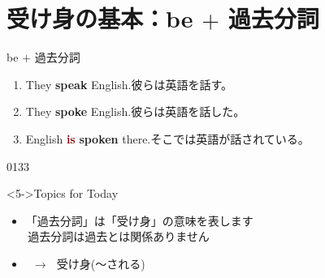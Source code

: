 \documentclass[aspectratio=169,xcolor={dvipsnames,table}]{beamer}
\newcommand{\myaudio}[1]{\href{#1}{\faVolumeUp}}
\begin{document}
\section{受け身の基本：be $+$ 過去分詞}
\begin{frame}[plain]{be $+$ 過去分詞}
 \large
\begin{enumerate}
 \item<1-> They \textbf{speak} English.\hfill{}{\small 彼らは英語を話す。}
 \item<2-> They \textbf{spoke} English.\hfill{\small 彼らは英語を話した。}
 \item<3-> English \textcolor{Maroon}{\bfseries is} \textcolor{NavyBlue}{\bfseries spoken} there.\hfill{\small そこでは英語が話されている。}
\end{enumerate}

\begin{center}
 
\end{center}


\hfill{\tiny 0133}\,{\scriptsize \myaudio{./audio/051_passive_01.mp3}}
\begin{exampleblock}<5->{Topics for Today}
\begin{itemize}[square]\small
 \item 「過去分詞」は「受け身」の意味を表します\\
\hfill{\textdbend\,過去分詞は過去とは関係ありません}\scalebox{2}{😭}
 \item {}\, $\longrightarrow$\,\,\,\,受け身(〜される)
\end{itemize}
     \end{exampleblock}
\end{frame}
\end{document}
